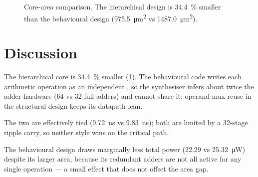 \begin{figure}[htbp]
\centering
{}
\caption{Core-area comparison. The hierarchical design is
\SI{34.4}{\percent} smaller than the behavioural design
(\SI{975.5}{\micro\meter\squared} vs \SI{1487.0}{\micro\meter\squared}).}
\label{fig:areacompare}
\end{figure}

\section{Discussion}
\begin{description}[leftmargin=1.6em,style=nextline]
  \item[Area] The hierarchical core is \SI{34.4}{\percent} smaller
        (\cref{fig:areacompare}). The behavioural code writes each
        arithmetic operation as an independent \code{+}, so the
        synthesiser infers about twice the adder hardware
        (64 vs 32 full adders) and cannot share it; operand-mux reuse in
        the structural design keeps its datapath lean.
  \item[Speed] The two are effectively tied
        (\SI{9.72}{\nano\second} vs \SI{9.83}{\nano\second}); both are
        limited by a 32-stage ripple carry, so neither style wins on the
        critical path.
  \item[Power] The behavioural design draws marginally less total power
        (\SI{22.29}{} vs \SI{25.32}{\micro\watt}) despite its larger area,
        because its redundant adders are not all active for any single
        operation --- a small effect that does not offset the area gap.
\end{description}

